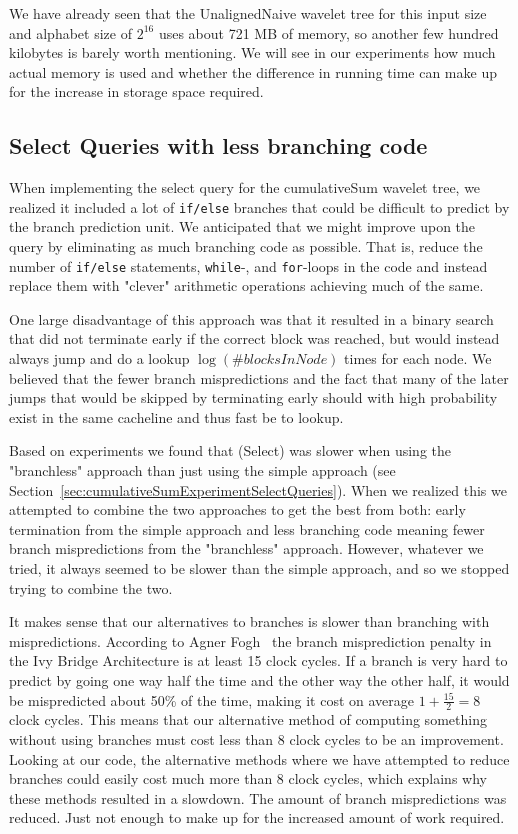 We have already seen that the UnalignedNaive wavelet tree for this input size and alphabet size of $2^{16}$ uses about 721 MB of memory, so another few hundred kilobytes is barely worth mentioning.
We will see in our experiments how much actual memory is used and whether the difference in running time can make up for the increase in storage space required.

\subsection{Select Queries with less branching code}
When implementing the select query for the cumulativeSum wavelet tree, we realized it included a lot of \texttt{if/else} branches that could be difficult to predict by the branch prediction unit.
We anticipated that we might improve upon the query by eliminating as much branching code as possible.
That is, reduce the number of \texttt{if/else} statements, \texttt{while}-, and \texttt{for}-loops in the code and instead replace them with "clever" arithmetic operations achieving much of the same.

One large disadvantage of this approach was that it resulted in a binary search that did not terminate early if the correct block was reached, but would instead always jump and do a lookup $\log(\#blocksInNode)$ times for each node.
We believed that the fewer branch mispredictions and the fact that many of the later jumps that would be skipped by terminating early should with high probability exist in the same cacheline and thus fast be to lookup.

Based on experiments we found that \textproc(Select) was slower when using the "branchless" approach than just using the simple approach (see Section~\ref{sec:cumulativeSumExperimentSelectQueries}).
When we realized this we attempted to combine the two approaches to get the best from both: early termination from the simple approach and less branching code meaning fewer branch mispredictions from the "branchless" approach.
However, whatever we tried, it always seemed to be slower than the simple approach, and so we stopped trying to combine the two.

It makes sense that our alternatives to branches is slower than branching with mispredictions.
According to Agner Fogh~ the branch misprediction penalty in the Ivy Bridge Architecture is at least 15 clock cycles.
If a branch is very hard to predict by going one way half the time and the other way the other half, it would be mispredicted about 50\% of the time, making it cost on average $1+\frac{15}{2}=8$ clock cycles.
This means that our alternative method of computing something without using branches must cost less than 8 clock cycles to be an improvement.
Looking at our code, the alternative methods where we have attempted to reduce branches could easily cost much more than 8 clock cycles, which explains why these methods resulted in a slowdown.
The amount of branch mispredictions was reduced. Just not enough to make up for the increased amount of work required.

